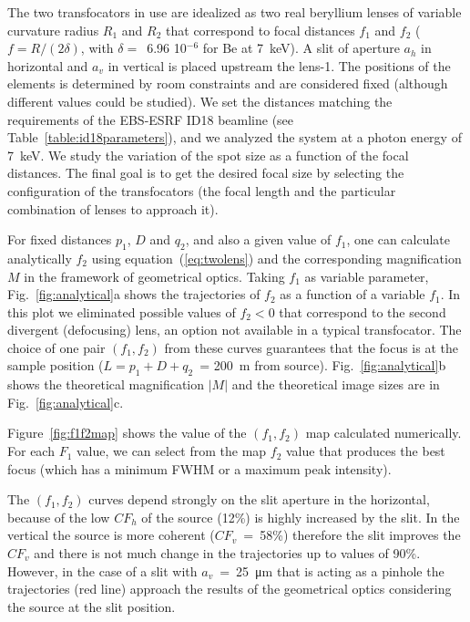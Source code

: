 \documentclass{iucr}              %
\begin{document}
The two transfocators in use are idealized as two real beryllium lenses of variable curvature radius $R_1$ and $R_2$ that correspond to focal distances $f_1$ and $f_2$ ($f=R/(2 \delta)$, with $\delta=$~6.96 10$^{-6}$ for Be at \SI{7}{keV}). A slit of aperture $a_h$ in horizontal and $a_v$ in vertical is placed upstream the lens-1. The positions of the elements is determined by room constraints and are considered fixed (although different values could be studied). We set the distances matching the requirements of the EBS-ESRF ID18 beamline (see Table~\ref{table:id18parameters}), and we analyzed the system at a photon energy of \SI{7}{keV}. We study the variation of the spot size as a function of the focal distances. The final goal is to get the desired focal size by selecting the configuration of the transfocators (the focal length and the particular combination of lenses to approach it). 

For fixed distances $p_1$, $D$ and $q_2$, and also a given value of $f_1$, one can calculate analytically $f_2$ using  equation~(\ref{eq:twolens}) and the corresponding magnification $M$ in the framework of geometrical optics. Taking $f_1$ as variable parameter,  
Fig.~\ref{fig:analytical}a shows the trajectories of $f_2$ as a function of a variable $f_1$. In this plot we eliminated possible values of $f_2<0$ that correspond to the second divergent (defocusing) lens, an option not available in a typical transfocator.  
The choice of one pair $(f_1,f_2)$ from these curves guarantees that the focus is at the sample position ($L=p_1+D+q_2$~= \SI{200}{\meter} from source). Fig.~\ref{fig:analytical}b shows the theoretical magnification $|M|$ and the theoretical image sizes are in Fig.~\ref{fig:analytical}c. 

Figure~\ref{fig:f1f2map} shows the value of the $(f_1,f_2)$ map calculated numerically. For each $F_1$ value, we can select from the map $f_2$ value that produces the best focus (which has a minimum FWHM or a maximum peak intensity). 

The $(f_1,f_2)$ curves depend strongly on the slit aperture in the horizontal, because of the low $CF_h$ of the source (12\%) is highly increased by the slit. In the vertical the source is more coherent ($CF_v$~=~58\%) therefore the slit improves the $CF_v$  and there is not much change in the trajectories up to values of 90\%. However, in the case of a slit with $a_v$~=~\SI{25}{\micro\meter} that is acting as a pinhole the trajectories (red line) approach the results of the geometrical optics considering the source at the slit position.
\end{document}
